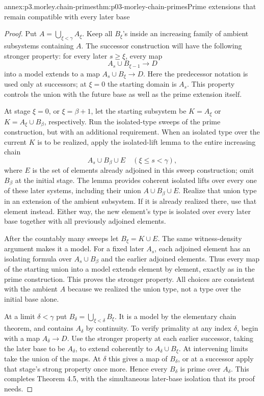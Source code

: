 \begin{annexitem}{annex:p3.morley.chain-primes}{thm:p03-morley-chain-primes}{Prime extensions that remain compatible with every later base}
\begin{proof}
Put \(A=\bigcup_{\xi<\gamma}A_\xi\).
Keep all \(B_\xi\)'s inside an
increasing family of ambient
subsystems containing \(A\).
The successor construction will
have the following stronger
property: for every later
\(s\geq\xi\), every map
\[
       A_s\cup B_{\xi-1}\longrightarrow D
\]
into a model extends to a map
\(A_s\cup B_\xi\to D\).
Here the predecessor notation
is used only at successors;
at \(\xi=0\) the starting
domain is \(A_s\). This
property controls the union
with the future base as well
as the prime extension itself.

At stage \(\xi=0\), or
\(\xi=\beta+1\), let the
starting subsystem be
\(K=A_\xi\) or
\(K=A_\xi\cup B_\beta\),
respectively. Run the isolated-type
sweeps of the prime construction,
but with an additional requirement.
When an isolated type over the
current \(K\) is to be realized,
apply the isolated-lift lemma
to the entire increasing chain
\[
  A_s\cup B_\beta\cup E
             \quad(\xi\leq s<\gamma),
\]
where \(E\) is the set of
elements already adjoined in
this sweep construction; omit
\(B_\beta\) at the initial
stage. The lemma provides
coherent isolated lifts over
every one of these later
systems, including their
union \(A\cup B_\beta\cup E\).
Realize that union type in an
extension of the ambient
subsystem. If it is already
realized there, use that
element instead. Either way,
the new element's type is
isolated over every later
base together with all
previously adjoined elements.

After the countably many
sweeps let \(B_\xi=K\cup E\).
The same witness-density
argument makes it a model.
For a fixed later \(A_s\),
each adjoined element has an
isolating formula over
\(A_s\cup B_\beta\) and
the earlier adjoined elements.
Thus every map of the starting
union into a model extends
element by element, exactly
as in the prime construction.
This proves the stronger
property. All choices are
consistent with the ambient
\(A\) because we realized
the union type, not a type
over the initial base alone.

At a limit \(\delta<\gamma\)
put \(B_\delta=\bigcup_{\xi<\delta}B_\xi\).
It is a model by the elementary
chain theorem, and contains
\(A_\delta\) by continuity.
To verify primality at any
index \(\delta\), begin with
a map \(A_\delta\to D\).
Use the stronger property at
each earlier successor, taking
the later base to be
\(A_\delta\), to extend
coherently to
\(A_\delta\cup B_\xi\).
At intervening limits take
the union of the maps. At
\(\delta\) this gives a map
of \(B_\delta\), or at a
successor apply that stage's
strong property once more.
Hence every \(B_\delta\)
is prime over \(A_\delta\).
This completes Theorem 4.5,
with the simultaneous later-base
isolation that its proof needs.
\end{proof}
\end{annexitem}


